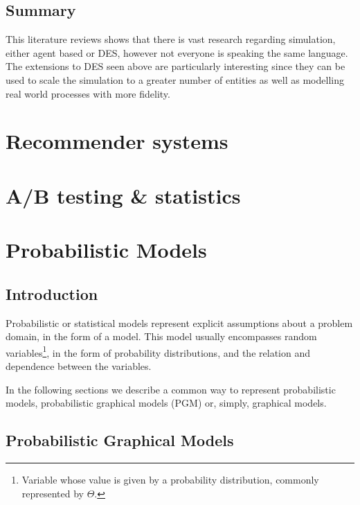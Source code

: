 \subsection{Summary}

This literature reviews shows that there is vast research regarding simulation, 
either agent based or DES, however not everyone is speaking the same language. 
The extensions to DES seen above are particularly interesting since they can be 
used to scale the simulation to a greater number of entities as well as 
modelling real world processes with more fidelity.

\section{Recommender systems}


\section{A/B testing \& statistics}

% 

\section{Probabilistic Models} \label{sec:models}

\subsection{Introduction}

Probabilistic or statistical models represent explicit assumptions about a 
problem domain, in the form of a model. This model usually encompasses random 
variables\footnote{Variable whose value is given by a probability distribution, 
commonly represented by $\Theta$.}, in the form of probability distributions,  
and the relation and dependence between the variables.~\cite{Winn2013}

In the following sections we describe a common way to represent probabilistic 
models, probabilistic graphical models (PGM) or, simply, graphical models.

\subsection{Probabilistic Graphical Models}

